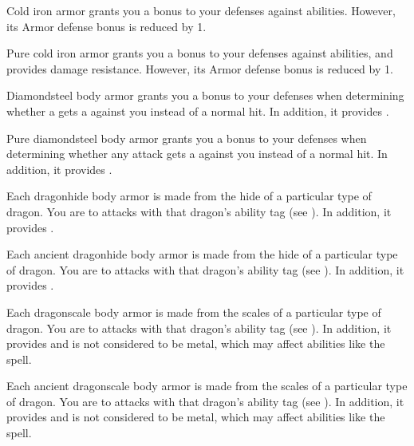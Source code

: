       Cold iron armor grants you a  bonus to your defenses against \magical abilities.
      However, its Armor defense bonus is reduced by 1.

       Pure cold iron armor grants you a  bonus to your defenses against \magical abilities, and provides  damage resistance.
      However, its Armor defense bonus is reduced by 1.

       Diamondsteel body armor grants you a  bonus to your defenses when determining whether a  gets a  against you instead of a normal hit.
      In addition, it provides  .

       Pure diamondsteel body armor grants you a  bonus to your defenses when determining whether any attack gets a  against you instead of a normal hit.
      In addition, it provides  .

       Each dragonhide body armor is made from the hide of a particular type of dragon.
      You are  to attacks with that dragon's ability tag (see ).
      In addition, it provides  .

       Each ancient dragonhide body armor is made from the hide of a particular type of dragon.
      You are  to attacks with that dragon's ability tag (see ).
      In addition, it provides  .

       Each dragonscale body armor is made from the scales of a particular type of dragon.
      You are  to attacks with that dragon's ability tag (see ).
      In addition, it provides   and is not considered to be metal, which may affect abilities like the  spell.

       Each ancient dragonscale body armor is made from the scales of a particular type of dragon.
      You are  to attacks with that dragon's ability tag (see ).
      In addition, it provides   and is not considered to be metal, which may affect abilities like the  spell.

